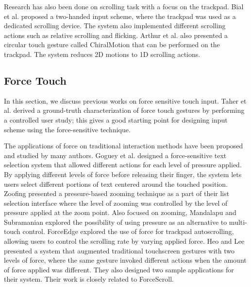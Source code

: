 \documentclass{sigchi}
\begin{document}
Research has also been done on scrolling task with a focus on the trackpad. Bial et al. \cite{bial2010study} proposed a two-handed input scheme, where the trackpad was used as a dedicated scrolling device. The system also implemented different scrolling actions such as relative scrolling and flicking. Arthur et al. \cite{arthur2008evaluating} also presented a circular touch gesture called ChiralMotion that can be performed on the trackpad. The system reduces 2D motions to 1D scrolling actions.


\subsection{Force Touch}
In this section, we discuss previous works on force sensitive touch input. Taher et al. \cite{taher2014empirical} derived a ground-truth characterization of force touch gestures by performing a controlled user study; this gives a good starting point for designing input scheme using the force-sensitive technique. 


The applications of force on traditional interaction methods have been proposed and studied by many authors. Goguey et al. \cite{goguey2018improving} designed a force-sensitive text selection system that allowed different actions for each level of pressure applied. By applying different levels of force before releasing their finger, the system lets users select different portions of text centered around the touched position. Zoofing \cite{quinn2009zoofing} presented a pressure-based zooming technique as a part of their list selection interface where the level of zooming was controlled by the level of pressure applied at the zoom point. Also focused on zooming, Mandalapu and Subramanian \cite{mandalapu2011exploring} explored the possibility of using pressure as an alternative to multi-touch control. ForceEdge \cite{antoine2017forceedge} explored the use of force for trackpad autoscrolling, allowing users to control the scrolling rate by varying applied force. Heo and Lee \cite{heo2011force} presented a system that augmented traditional touchscreen gestures with two levels of force, where the same gesture invoked different actions when the amount of force applied was different. They also designed two sample applications for their system. Their work is closely related to ForceScroll. 
\end{document}
